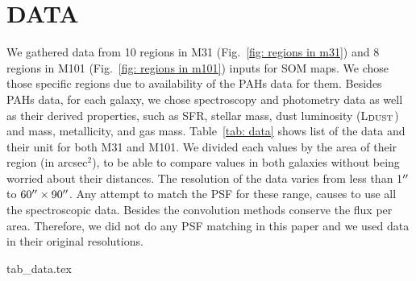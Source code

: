 
\section{DATA}

We gathered data from 10 regions in M31 (Fig.~\ref{fig: regions in m31})  and 8 regions in M101 (Fig.~\ref{fig: regions in m101})  inputs for SOM maps.
We chose those specific regions due to availability of the PAHs data for them.
Besides PAHs data, for each galaxy, we chose spectroscopy and photometry data as well as their derived properties, such as SFR, stellar mass, dust luminosity (L$_{\rm DUST}$) and mass, metallicity, and gas mass.
Table~\ref{tab: data} shows list of the data and their unit for both M31 and M101.
We divided each values by the area of their region (in arcsec$^2$), to be able to compare values in both galaxies without being worried about their distances.
The resolution of the data varies from less than 1$\hbox{$^{\prime\prime}$}$ to $60\hbox{$^{\prime\prime}$} \times 90 \hbox{$^{\prime\prime}$}$.
Any attempt to match the PSF for these range, causes to use all the spectroscopic data.
Besides the convolution methods conserve the flux per area.
Therefore, we did not do any PSF matching in this paper and we used data in their original resolutions.


{tab_data.tex}


